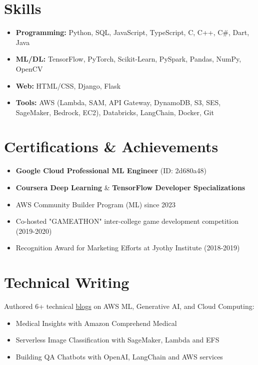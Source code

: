 \documentclass[10pt,a4paper]{article}
\begin{document}
\section*{Skills}
\begin{multicols}{2}
\begin{itemize}
    \item \textbf{Programming:} Python, SQL, JavaScript, TypeScript, C, C++, C\#, Dart, Java
    \item \textbf{ML/DL:} TensorFlow, PyTorch, Scikit-Learn, PySpark, Pandas, NumPy, OpenCV
    \item \textbf{Web:} HTML/CSS, Django, Flask
    \item \textbf{Tools:} AWS (Lambda, SAM, API Gateway, DynamoDB, S3, SES, SageMaker, Bedrock, EC2), Databricks, LangChain, Docker, Git
\end{itemize}
\end{multicols}

\section*{Certifications \& Achievements}
\begin{itemize}
    \item \textbf{Google Cloud Professional ML Engineer} (ID: 2d680a48)
    \item \textbf{Coursera Deep Learning} \& \textbf{TensorFlow Developer Specializations}
    \item AWS Community Builder Program (ML) since 2023
    \item Co-hosted "GAMEATHON" inter-college game development competition (2019-2020)
    \item Recognition Award for Marketing Efforts at Jyothy Institute (2018-2019)
\end{itemize}

\section*{Technical Writing}
Authored 6+ technical \href{https://www.antstack.com/author/pradhyumna-n-holla/}{blogs} on AWS ML, Generative AI, and Cloud Computing:
\begin{itemize}
    \item Medical Insights with Amazon Comprehend Medical
    \item Serverless Image Classification with SageMaker, Lambda and EFS
    \item Building QA Chatbots with OpenAI, LangChain and AWS services
\end{itemize}
\end{document}
